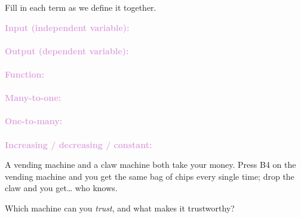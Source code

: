 \documentclass[10pt]{article}
\begin{document}

\vspace{0.12in}

\boxguard
\begin{vocabbox}
Fill in each term as we define it together.
\par\vspace{2pt}
\noindent\textbf{\textcolor{plum}{Input (independent variable):}}\\[1pt]
\writeline\\[3pt]
\noindent\textbf{\textcolor{plum}{Output (dependent variable):}}\\[1pt]
\writeline\\[3pt]
\noindent\textbf{\textcolor{plum}{Function:}}\\[1pt]
\writeline\\[3pt]
\noindent\textbf{\textcolor{plum}{Many-to-one:}}\\[1pt]
\writeline\\[3pt]
\noindent\textbf{\textcolor{plum}{One-to-many:}}\\[1pt]
\writeline\\[3pt]
\noindent\textbf{\textcolor{plum}{Increasing / decreasing / constant:}}\\[1pt]
\writeline
\end{vocabbox}

\vspace{0.1in}

\boxguard
\begin{hookbox}
A vending machine and a claw machine both take your money. Press B4 on the vending
machine and you get the same bag of chips every single time; drop the claw and you
get\ldots{} who knows.

Which machine can you \textit{trust}, and what makes it trustworthy?
\end{hookbox}
\end{document}
